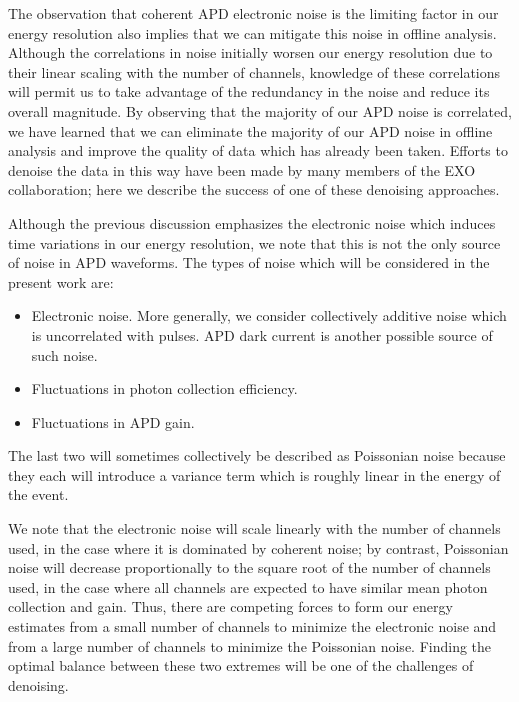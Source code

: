 The observation that coherent APD electronic noise is the limiting factor in our energy resolution also implies that we can mitigate this noise in offline analysis.  Although the correlations in noise initially worsen our energy resolution due to their linear scaling with the number of channels, knowledge of these correlations will permit us to take advantage of the redundancy in the noise and reduce its overall magnitude.  By observing that the majority of our APD noise is correlated, we have learned that we can eliminate the majority of our APD noise in offline analysis and improve the quality of data which has already been taken.  Efforts to denoise the data in this way have been made by many members of the EXO collaboration; here we describe the success of one of these denoising approaches.

Although the previous discussion emphasizes the electronic noise which induces time variations in our energy resolution, we note that this is not the only source of noise in APD waveforms.  The types of noise which will be considered in the present work are:
\begin{itemize}
\item Electronic noise.  More generally, we consider collectively additive noise which is uncorrelated with pulses.  APD dark current is another possible source of such noise.
\item Fluctuations in photon collection efficiency.
\item Fluctuations in APD gain.
\end{itemize}
The last two will sometimes collectively be described as Poissonian noise because they each will introduce a variance term which is roughly linear in the energy of the event.

We note that the electronic noise will scale linearly with the number of channels used, in the case where it is dominated by coherent noise; by contrast, Poissonian noise will decrease proportionally to the square root of the number of channels used, in the case where all channels are expected to have similar mean photon collection and gain.  Thus, there are competing forces to form our energy estimates from a small number of channels to minimize the electronic noise and from a large number of channels to minimize the Poissonian noise.  Finding the optimal balance between these two extremes will be one of the challenges of denoising.

